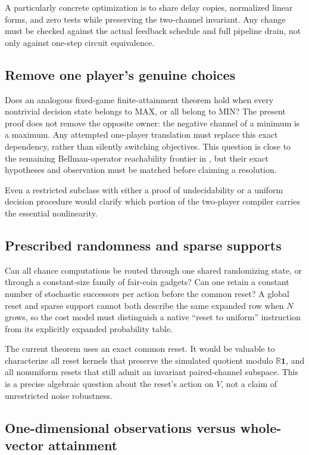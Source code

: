 \documentclass[11pt,letterpaper]{article}
\theoremstyle{definition}
\theoremstyle{remark}
\newcommand{\R}{\mathbb R}
\newcommand{\one}{\mathbf 1}
\begin{document}
A particularly concrete optimization is to share delay copies, normalized
linear forms, and zero tests while preserving the two-channel invariant.
Any change must be checked against the actual feedback schedule and full
pipeline drain, not only against one-step circuit equivalence.

\subsection{Remove one player's genuine choices}\label{ste:ec:q:oneplayer}

Does an analogous fixed-game finite-attainment theorem hold when every
nontrivial decision state belongs to MAX, or all belong to MIN? The
present proof does not remove the opposite owner: the negative channel
of a minimum is a maximum. Any attempted one-player translation must
replace this exact dependency, rather than silently switching objectives.
This question is close to the remaining Bellman-operator reachability
frontier in \cite{varonka}, but their exact hypotheses and observation
must be matched before claiming a resolution.

Even a restricted subclass with either a proof of undecidability or a
uniform decision procedure would clarify which portion of the two-player
compiler carries the essential nonlinearity.

\subsection{Prescribed randomness and sparse supports}\label{ste:ec:q:sparse}

Can all chance computations be routed through one shared randomizing
state, or through a constant-size family of fair-coin gadgets? Can one
retain a constant number of stochastic successors per action before the
common reset? A global reset and sparse support cannot both describe the
same expanded row when $N$ grows, so the cost model must distinguish a
native ``reset to uniform'' instruction from its explicitly expanded
probability table.

The current theorem uses an exact common reset. It would be valuable to
characterize all reset kernels that preserve the simulated quotient
modulo $\R\one$, and all nonuniform resets that still admit an invariant
paired-channel subspace. This is a precise algebraic question about the
reset's action on $V$, not a claim of unrestricted noise robustness.

\subsection{One-dimensional observations versus whole-vector attainment}\label{ste:ec:q:observations}
\end{document}
